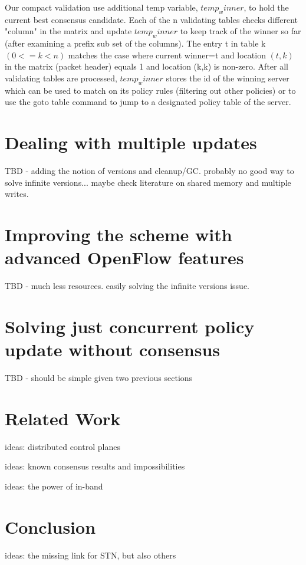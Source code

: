 \documentclass[conference]{sigcomm-alternate}
\begin{document}
Our compact validation use additional temp variable, $temp_winner$, to hold the current best consensus candidate. Each of the n validating tables checks different "column" in the matrix and update $temp_winner$ to keep track of the winner so far (after examining a prefix sub set of the columns). The entry t in table k $(0<=k<n)$  matches the case where current winner=t and location $(t,k)$ in the matrix (packet header) equals 1 and location (k,k) is non-zero. After all validating tables are processed, $temp_winner$ stores the id of the winning server which can be used to match on its policy rules (filtering out other policies) or to use the goto table command to jump to a designated policy table of the server.


\section{Dealing with multiple updates}\label{sec:todo}

TBD - adding the notion of versions and cleanup/GC. probably no good way to solve infinite versions... maybe check literature on shared memory and multiple writes.


\section{Improving the scheme with advanced OpenFlow features}\label{sec:todo}

TBD - much less resources. easily solving the infinite versions issue.


\section{Solving just concurrent policy update without consensus}\label{sec:todo}

TBD - should be simple given two previous sections


\section{Related Work}\label{sec:relwork}

ideas: distributed control planes

ideas: known consensus results and impossibilities

ideas: the power of in-band

\section{Conclusion}\label{sec:conclusion}

ideas: the missing link for STN, but also others


\end{document}
